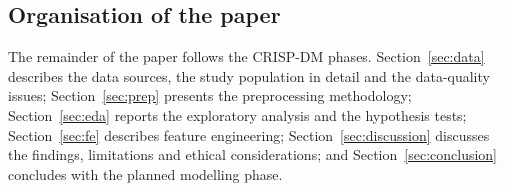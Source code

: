 \subsection{Organisation of the paper}\label{sec:organisation}

The remainder of the paper follows the CRISP-DM phases. Section~\ref{sec:data} describes the data sources, the study population in detail and the data-quality issues; Section~\ref{sec:prep} presents the preprocessing methodology; Section~\ref{sec:eda} reports the exploratory analysis and the hypothesis tests; Section~\ref{sec:fe} describes feature engineering; Section~\ref{sec:discussion} discusses the findings, limitations and ethical considerations; and Section~\ref{sec:conclusion} concludes with the planned modelling phase.
